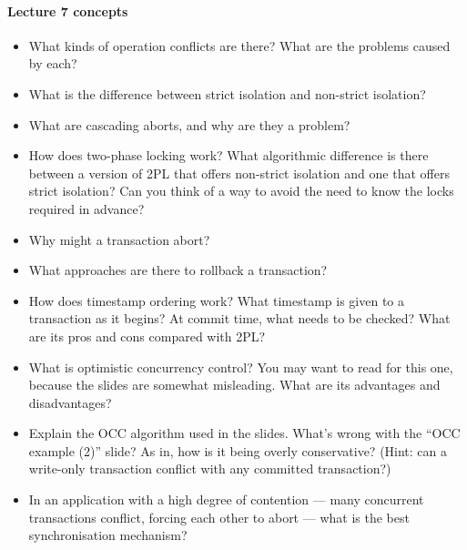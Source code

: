 \documentclass[12pt,a4paper,oneside,openright]{report}
\newcommand{\question}[2]{\paragraph{#1} #2}
\begin{document}
\question{Lecture 7 concepts}{
  \begin{itemize}
  \item What kinds of operation conflicts are there? What are the
    problems caused by each?
  \item What is the difference between strict isolation and non-strict
    isolation?
  \item What are cascading aborts, and why are they a problem?
  \item How does two-phase locking work? What algorithmic difference
    is there between a version of 2PL that offers non-strict isolation
    and one that offers strict isolation? Can you think of a way to
    avoid the need to know the locks required in advance?
  \item Why might a transaction abort?
  \item What approaches are there to rollback a transaction?
  \item How does timestamp ordering work? What timestamp is given to a
    transaction as it begins? At commit time, what needs to be
    checked? What are its pros and cons compared with 2PL?
  \item What is optimistic concurrency control? You may want to read
    \cite[Chapter~20.6]{bacon2003operating} for this one, because the
    slides are somewhat misleading. What are its advantages and
    disadvantages?
  \item Explain the OCC algorithm used in the slides. What's wrong
    with the ``OCC example (2)'' slide? As in, how is it being overly
    conservative? (Hint: can a write-only transaction conflict with
    any committed transaction?)
  \item In an application with a high degree of contention --- many
    concurrent transactions conflict, forcing each other to abort ---
    what is the best synchronisation mechanism?
  \end{itemize}
}
\end{document}
